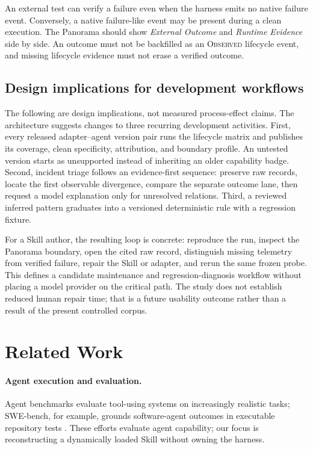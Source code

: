\documentclass[runningheads]{llncs}
\newcommand{\observed}{\textsc{Observed}\xspace}
\begin{document}
An external test can verify a failure even when the harness emits no native
failure event.  Conversely, a native failure-like event may be present during a
clean execution.  The Panorama should show \emph{External Outcome} and
\emph{Runtime Evidence} side by side.  An outcome must not be backfilled as an
\observed lifecycle event, and missing lifecycle evidence must not erase a
verified outcome.

\subsection{Design implications for development workflows}

The following are design implications, not measured process-effect claims. The
architecture suggests changes to three recurring development activities.
First, every released adapter--agent version pair runs the lifecycle matrix and
publishes its coverage,
clean specificity, attribution, and boundary profile.  An untested version starts
as unsupported instead of inheriting an older capability badge.  Second, incident
triage follows an evidence-first sequence: preserve raw records, locate the first
observable divergence, compare the separate outcome lane, then request
a model explanation only for unresolved relations.  Third, a reviewed inferred
pattern graduates into a versioned deterministic rule with a regression fixture.

For a Skill author, the resulting loop is concrete: reproduce the run, inspect
the Panorama boundary, open the cited raw record, distinguish missing telemetry
from verified failure, repair the Skill or adapter, and rerun the same frozen
probe. This defines a candidate maintenance and regression-diagnosis workflow
without placing a model provider on the critical path. The study does not establish reduced
human repair time; that is a future usability outcome rather than a result of
the present controlled corpus.

\section{Related Work}

\paragraph{Agent execution and evaluation.}
Agent benchmarks evaluate tool-using systems on increasingly realistic tasks;
SWE-bench, for example, grounds software-agent outcomes in executable
repository tests \cite{swebench}. These efforts evaluate agent capability; our
focus is reconstructing a dynamically loaded Skill without owning the harness.
\end{document}
